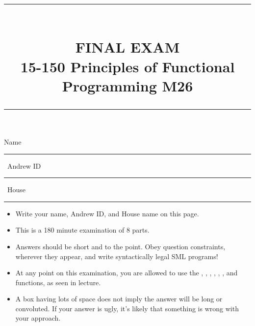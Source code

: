 \documentclass[addpoints,12pt]{exam}
\newcommand{\HRule}[1]{\rule{\linewidth}{#1}}
\begin{document}
\pagestyle{headandfoot}
\footer{}{\thepage}{}


\setlength{\droptitle}{-8em}   %

\title{ \normalsize \textsc{}
		\HRule{1.5pt} \\
		\large \textbf{
      \uppercase{Final Exam} \\
      15-150 Principles of Functional Programming M26} \\
    \vspace{-0.15cm}
    \HRule{1.5pt}
}
\date{}

\maketitle

\vspace{-2.5cm}

Name \rule{5cm}{0.4pt} \, Andrew ID \rule{3cm}{0.4pt} \, House \rule{3.5cm}{0.4pt}

\vspace{5pt}

\begin{itemize}
  \item Write your name, Andrew ID, and House name on this page.
  \vspace{-5pt}
  \item This is a 180 minute examination of 8 parts.
  \vspace{-5pt}
  \item Answers should be short and to the point. Obey question constraints, wherever
  they appear, and write syntactically legal SML programs!
  \vspace{-5pt}
  \item At any point on this examination, you are allowed to use the ,
  , , , , , and  functions,
  as seen in lecture.
  \vspace{-5pt}
  \item A box having lots of space does not imply the answer will be long or convoluted. If your
  answer is ugly, it's likely that something is wrong with your approach.
\end{itemize}
\vspace{\fill}
\end{document}
